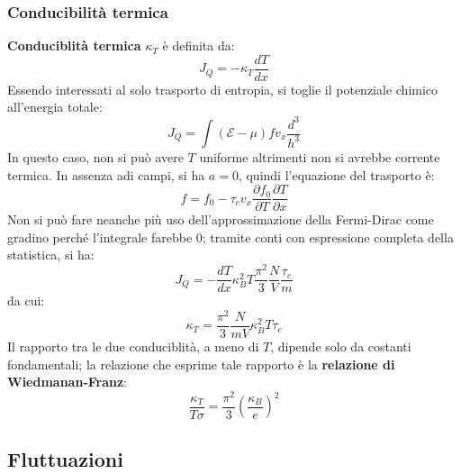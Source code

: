 \documentclass[10pt, a4paper]{scrartcl}
\numberwithin{equation}{subsection}
\theoremstyle{style1}
\begin{document}
\subsubsection{Conducibilit\`a termica}
\textbf{Conduciblit\`a termica} $\kappa _T$ \`e definita da:
\begin{equation}
	J_Q = - \kappa _T \frac{d T}{d x} 
\end{equation}
Essendo interessati al solo trasporto di entropia, si toglie il potenziale chimico all'energia totale:
\begin{equation}
	J_Q = \int (\mathscr{E} -\mu ) f v_x \frac{d^3 }{h^3}
\end{equation}
In questo caso, non si pu\`o avere $T $ uniforme altrimenti non si avrebbe corrente termica.
In assenza adi campi, si ha $a=0$, quindi l'equazione del trasporto \`e:
\begin{equation}
	f = f_0 - \tau _c v_x \frac{\partial f_0}{\partial T}  \frac{\partial T}{\partial x} 
\end{equation}
Non si pu\`o fare neanche pi\`u uso dell'approssimazione della Fermi-Dirac come gradino perch\'e l'integrale farebbe $0$;
tramite conti con espressione completa della statistica, si ha:
\begin{equation}
	J_Q = -\frac{d T}{d x} \kappa _B ^2 T \frac{\pi^2}{3}\frac{N}{V}\frac{\tau _c}{m}
\end{equation}
da cui:
\begin{equation}
	\kappa _T = \frac{\pi^2}{3} \frac{N}{mV}\kappa _B ^2 T \tau _c
\end{equation}
Il rapporto tra le due conduciblit\`a, a meno di $T$, dipende solo da costanti fondamentali;
la relazione che esprime tale rapporto \`e la \textbf{relazione di Wiedmanan-Franz}:
\begin{equation}
	\frac{\kappa _T}{T \sigma } = \frac{\pi^2}{3} \left(\frac{\kappa _B}{e}\right) ^2
\end{equation}

\subsection{Fluttuazioni}
\end{document}
